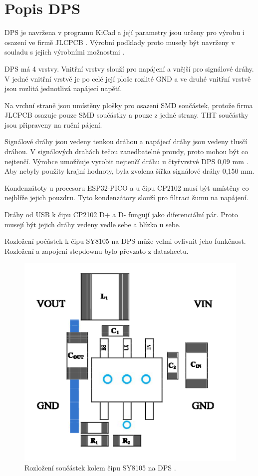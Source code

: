 \chapter{Popis DPS}
DPS je navržena v programu KiCad a její parametry jsou určeny pro výrobu i osazení ve firmě JLCPCB \cite{JLCPCB}. Výrobní 
podklady proto musely být navrženy v souladu s jejich výrobními možnostmi \cite{JLCPCB_Capabilities}.

DPS má 4 vrstvy. Vnitřní vrstvy slouží pro napájení a vnější pro signálové dráhy. V jedné vnitřní vrstvě je po celé její ploše 
rozlité GND a ve druhé vnitřní vrstvě jsou rozlitá jednotlivá napájecí napětí.

Na vrchní straně jsou umístěny plošky pro osazení SMD součástek, protože firma JLCPCB osazuje pouze SMD součástky a pouze z jedné 
strany. THT součástky jsou připraveny na ruční pájení.

Signálové dráhy jsou vedeny tenkou dráhou a napájecí dráhy jsou vedeny tlusčí dráhou. V signálových drahách tečou zanedbatelné 
proudy, proto mohou být co nejtenčí. Výrobce umožňuje vyrobit nejtenčí dráhu u čtyřvrstvé DPS 0,09 mm \cite{JLCPCB_Capabilities}. 
Aby nebyly použity krajní hodnoty, byla zvolena šířka signálové dráhy 0,150 mm.

Kondenzátoty u procesoru ESP32-PICO a u čipu CP2102 musí být umístěny co nejblíže jejich pouzdru. Tyto kondenzátory slouží pro 
filtraci šumu na napájení.

Dráhy od USB k čipu CP2102 D+ a D- fungují jako diferenciální pár. Proto musejí být jejich dráhy vedeny vedle sebe a blízko u 
sebe.

Rozložení počástek k čipu SY8105 na DPS může velmi ovlivnit jeho funkčnost. Rozložení a zapojení stepdownu 
bylo převzato z datasheetu.

\begin{figure}[!h]
  \begin{center}
    \includegraphics[scale=1]{obrazky/SY8105_rozlozeni_na_DPS.png}
  \end{center}
  \caption[Rozložení součástek kolem čipu SY8105 na DPS]{Rozložení součástek kolem čipu SY8105 na DPS \cite{SY8105_datasheet}.}
\end{figure}

